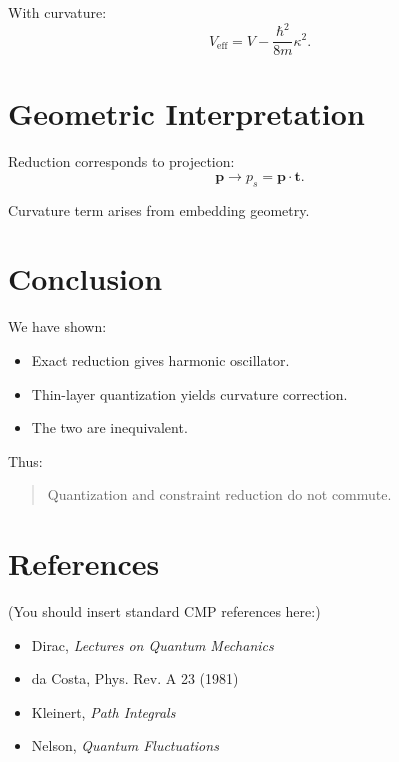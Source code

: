 \documentclass[11pt]{article}
\begin{document}
With curvature:
\begin{equation}
V_{\text{eff}} = V - \frac{\hbar^2}{8m}\kappa^2.
\end{equation}

\section{Geometric Interpretation}

Reduction corresponds to projection:
\begin{equation}
\mathbf{p} \to p_s = \mathbf{p}\cdot\mathbf{t}.
\end{equation}

Curvature term arises from embedding geometry.

\section{Conclusion}

We have shown:

\begin{itemize}
\item Exact reduction gives harmonic oscillator.
\item Thin-layer quantization yields curvature correction.
\item The two are inequivalent.
\end{itemize}

Thus:

\begin{quote}
Quantization and constraint reduction do not commute.
\end{quote}

\section*{References}

(You should insert standard CMP references here:)

\begin{itemize}
\item Dirac, \textit{Lectures on Quantum Mechanics}
\item da Costa, Phys. Rev. A 23 (1981)
\item Kleinert, \textit{Path Integrals}
\item Nelson, \textit{Quantum Fluctuations}
\end{itemize}
\end{document}
